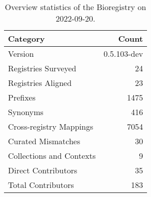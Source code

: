 \begin{table}
\centering
\caption{Overview statistics of the Bioregistry on 2022-09-20.}
\label{tab:bioregistry-summary}
\begin{tabular}{lr}
\toprule
                Category &       Count \\
\midrule
                 Version & 0.5.103-dev \\
     Registries Surveyed &          24 \\
      Registries Aligned &          23 \\
                Prefixes &        1475 \\
                Synonyms &         416 \\
 Cross-registry Mappings &        7054 \\
      Curated Mismatches &          30 \\
Collections and Contexts &           9 \\
     Direct Contributors &          35 \\
      Total Contributors &         183 \\
\bottomrule
\end{tabular}
\end{table}
